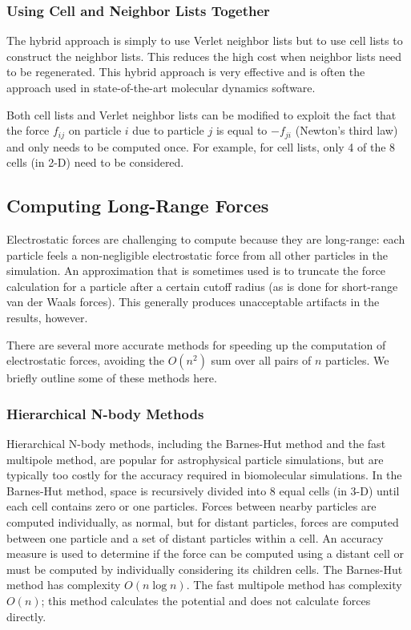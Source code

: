 \subsubsection*{Using Cell and Neighbor Lists Together}  
The hybrid approach is simply to use Verlet neighbor
lists but to use cell lists to construct the neighbor lists.  This reduces
the high cost when neighbor lists need to be regenerated.  This hybrid approach
is very effective and is often the approach used in state-of-the-art 
molecular dynamics software.

Both cell lists and Verlet neighbor lists can be modified to exploit the fact
that the force $f_{ij}$ on particle $i$ due to particle $j$ is
equal to $-f_{ji}$ (Newton's third law) and only needs to be
computed once.  For example, for cell lists,
only 4 of the 8 cells (in 2-D) need to be considered.

\subsection{Computing Long-Range Forces}

Electrostatic forces are challenging to compute because they are
long-range:  each particle feels a non-negligible electrostatic force
from all other particles in the simulation.  An approximation that is
sometimes used is to truncate the force calculation for a particle after
a certain cutoff radius (as is done for short-range van der Waals forces).
This generally produces unacceptable artifacts in the results, however.

There are several more accurate methods for speeding up
the computation of electrostatic forces, avoiding the $O(n^2)$
sum over all pairs of $n$ particles.  We briefly outline some of these
methods here.

\subsubsection*{Hierarchical N-body Methods}  
Hierarchical N-body methods, including
the Barnes-Hut method and the fast multipole method, are popular for
astrophysical particle simulations, but are typically too costly for the
accuracy required in biomolecular simulations.  In the Barnes-Hut method,
space is recursively divided into 8 equal cells (in 3-D) until each
cell contains zero or one particles.  Forces between nearby particles
are computed individually, as normal, but for distant particles, forces
are computed between one particle and a set of distant particles within
a cell.  An accuracy measure is used to determine if the force can
be computed using a distant cell or must be computed by individually
considering its children cells.  The Barnes-Hut method has complexity
$O(n \log n)$.  The fast multipole method has complexity
$O(n)$; this method calculates the potential and does not calculate forces directly.


